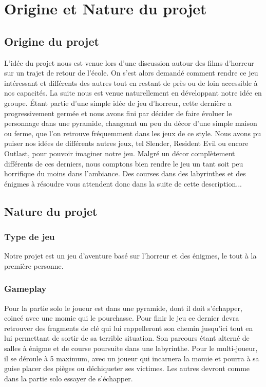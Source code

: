 \documentclass[12pt,a4paper]{article}
\begin{document}
\newpage
\section{Origine et Nature du projet}
\subsection{Origine du projet}
L'idée du projet nous est venue lors d'une discussion autour des films
d'horreur sur un trajet de retour de l'école. On s'est alors demandé comment rendre ce
jeu intéressant et différents des autres tout en restant de près ou de loin accessible à nos capacités.
La suite nous est venue naturellement en développant
notre idée en groupe. Étant partie d'une simple idée de jeu d'horreur, cette dernière a progressivement germée et
nous avons fini par décider de faire évoluer le personnage dans une pyramide, changeant un peu du
décor d'une simple maison ou ferme, que l'on retrouve fréquemment dans les jeux de ce style.
Nous avons pu puiser nos idées de différents autres jeux, tel Slender, Resident Evil ou encore Outlast,
pour pouvoir imaginer notre jeu. Malgré un décor complètement différents de ces derniers, nous
comptons bien rendre le jeu un tant soit peu horrifique du moins dans l'ambiance.
Des courses dans des labyrinthes et des énigmes à résoudre vous attendent donc dans la suite de cette
description...

\newpage
\subsection{Nature du projet}
\subsubsection{Type de jeu}
Notre projet est un jeu d'aventure basé sur l'horreur et des énigmes, le tout à la première personne.
\subsubsection{Gameplay}
Pour la partie solo le joueur est dans une pyramide, dont il doit s'échapper, coincé avec une momie qui le pourchasse. Pour finir le jeu ce dernier devra retrouver des fragments de clé qui lui rappelleront son chemin jusqu'ici tout en lui permettant de sortir de sa terrible situation. Son parcours étant alterné de salles à énigme et de course poursuite dans une labyrinthe.
Pour le multi-joueur, il se déroule à 5 maximum, avec un joueur qui incarnera la momie et pourra à sa guise placer des pièges ou déchiqueter ses victimes.
Les autres devront comme dans la partie solo essayer de s'échapper.
\end{document}
